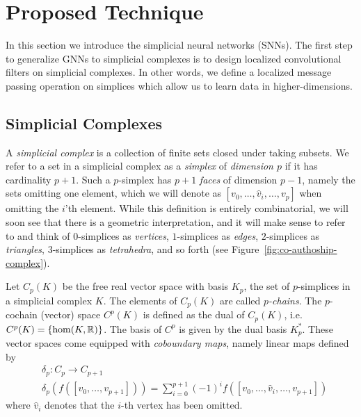 \section{Proposed Technique}
In this section we introduce the simplicial neural networks (SNNs). The first step to generalize GNNs to simplicial complexes is to design localized convolutional filters on simplicial complexes. In other words, we define a localized message passing operation on simplices which allow us to learn data in higher-dimensions.

\subsection{Simplicial  Complexes}
A \emph{simplicial complex} is a collection of finite sets closed under taking subsets. We refer to a set in a simplicial complex as a \emph{simplex} of \emph{dimension $p$} if it has cardinality $p+1$. Such a $p$-simplex has $p+1$ \emph{faces} of dimension $p-1$, namely the sets omitting one element, which we will denote as $[v_0,\dotsc,\hat{v}_i,\dotsc, v_p]$ when omitting the $i$'th element. While this definition is entirely combinatorial, we will soon see that there is a geometric interpretation, and it will make sense to refer to and think of $0$-simplices as \emph{vertices}, $1$-simplices as \emph{edges}, $2$-simplices as \emph{triangles}, $3$-simplices as \emph{tetrahedra}, and so forth (see Figure~\ref{fig:co-authoship-complex}).

Let $C_p(K)$ be the free real vector space with basis $K_p$, the set of $p$-simplices in 
a simplicial complex $K$. The elements of $C_p(K)$ are called \emph{$p$-chains}. The 
$p$-cochain (vector) space $C^p(K)$ is defined as the dual of $C_p(K)$, i.e. $C^p(K)=\{\hom(K,\mathbb{R})\}$. The basis of $C^p$ is given by the dual basis $K_p^*$. These vector spaces come equipped with \emph{coboundary maps}, namely linear maps defined by
\begin{align*}
  &\delta_p:C_p\to C_{p+1} \\
  &\delta_p(f([v_0,\dotsc,v_{p+1}])) = \sum_{i=0}^{p+1} (-1)^i f([v_0,\dotsc,\hat{v}_i,\dotsc,v_{p+1}])
\end{align*}
where $\hat{v}_i$ denotes that the $i$-th vertex has been omitted. 

  
